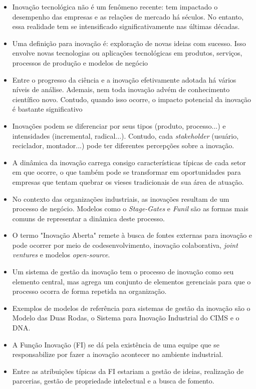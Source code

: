 \documentclass{article}
\begin{document}
\begin{itemize}
    \item Inovação tecnológica não é um fenômeno recente: tem impactado o desempenho das empresas e as relações de mercado há séculos. No entanto, essa realidade tem se intensificado significativamente nas últimas décadas.
    \item Uma definição para inovação é: exploração de novas ideias com sucesso. Isso envolve novas tecnologias ou aplicações tecnológicas em produtos, serviços, processos de produção e modelos de negócio
    \item Entre o progresso da ciência e a inovação efetivamente adotada há vários níveis de análise. Ademais, nem toda inovação advém de conhecimento científico novo. Contudo, quando isso ocorre, o impacto potencial da inovação é bastante significativo
    \item Inovações podem se diferenciar por seus tipos (produto, processo...) e intensidades (incremental, radical...). Contudo, cada \textit{stakeholder} (usuário, reciclador, montador...) pode ter diferentes percepções sobre a inovação.
    \item A dinâmica da inovação carrega consigo características típicas de cada setor em que ocorre, o que também pode se transformar em oportunidades para empresas que tentam quebrar os vieses tradicionais de sua área de atuação.
    \item No contexto das organizações industriais, as inovações resultam de um processo de negócio. Modelos como o \textit{Stage-Gates} e \textit{Funil} são as formas mais comuns de representar a dinâmica deste processo.
    \item O termo "Inovação Aberta" remete à busca de fontes externas para inovação e pode ocorrer por meio de codesenvolvimento, inovação colaborativa, \textit{joint ventures} e modelos \textit{open-source}.
    \item Um sistema de gestão da inovação tem o processo de inovação como seu elemento central, mas agrega um conjunto de elementos gerenciais para que o processo ocorra de forma repetida na organização.
    \item Exemplos de modelos de referência para sistemas de gestão da inovação são o Modelo das Duas Rodas, o Sistema para Inovação Industrial do CIMS e o DNA.
    \item A Função Inovação (FI) se dá pela existência de uma equipe que se responsabilize por fazer a inovação acontecer no ambiente industrial. 
    \item Entre as atribuições típicas da FI estariam a gestão de ideias, realização de parcerias, gestão de propriedade intelectual e a busca de fomento.
\end{itemize}
\end{document}
